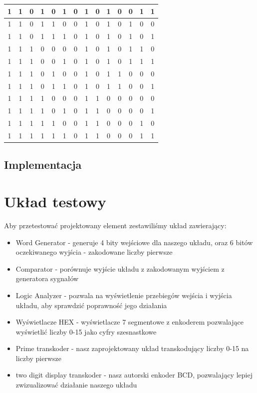 \documentclass[a4paper]{article}
\begin{document}
\begin{center}
\begin{tabular}{|c|c|c|c|c|c||c|c|c|c|c|c|c|c|}
  \hline 1 & 1 & 0 & 1 & 0 & 1 & 0   &  	1 &	0 &	1 &	0 &	0	& 1	& 1 \\
  \hline 1 & 1 & 0 & 1 & 1 & 0 & 0   &  	1 &	0 &	1 &	0 &	1	& 0	& 0 \\
  \hline 1 & 1 & 0 & 1 & 1 & 1 & 0   &  	1 &	0 &	1 &	0 &	1	& 0	& 1 \\
  \hline 1 & 1 & 1 & 0 & 0 & 0 & 0   &  	1 &	0 &	1 &	0 &	1	& 1	& 0 \\
  \hline 1 & 1 & 1 & 0 & 0 & 1 & 0   &  	1 &	0 &	1 &	0 &	1	& 1	& 1 \\
  \hline 1 & 1 & 1 & 0 & 1 & 0 & 0   &  	1 &	0 &	1 &	1 &	0	& 0	& 0 \\
  \hline 1 & 1 & 1 & 0 & 1 & 1 & 0   &  	1 &	0 &	1 &	1 &	0	& 0	& 1 \\
  \hline 1 & 1 & 1 & 1 & 0 & 0 & 0   &  	1 &	1 &	0 &	0 &	0	& 0	& 0 \\
  \hline 1 & 1 & 1 & 1 & 0 & 1 & 0   &  	1 &	1 &	0 &	0 &	0	& 0	& 1 \\
  \hline 1 & 1 & 1 & 1 & 1 & 0 & 0   &  	1 &	1 &	0 &	0 &	0	& 1	& 0 \\
  \hline 1 & 1 & 1 & 1 & 1 & 1 & 0   &  	1 &	1 &	0 &	0 &	0	& 1	& 1 \\
  \hline 
  \end{tabular}
\end{center} 

\subsection{Implementacja}
\section{Układ testowy}
Aby przetestować projektowany element zestawiliśmy układ zawierający:
\begin{itemize}
  \item Word Generator - generuje 4 bity wejściowe dla naszego układu, oraz 6 bitów oczekiwanego wyjścia - zakodowane liczby pierwsze
  \item Comparator - porównuje wyjście układu z zakodowanym wyjściem z generatora sygnałów
  \item Logic Analyzer - pozwala na wyświetlenie przebiegów wejścia i wyjścia układu, aby sprawdzić poprawność jego działania
  \item Wyświetlacze HEX - wyświetlacze 7 segmentowe z enkoderem pozwalające wyświetlić liczby 0-15 jako cyfry szesnastkowe
  \item Prime transkoder - nasz zaprojektowany układ transkodujący liczby 0-15 na liczby pierwsze
  \item two digit display transkoder - nasz autorski enkoder BCD, pozwalający lepiej zwizualizować działanie naszego układu
\end{itemize}
\end{document}
